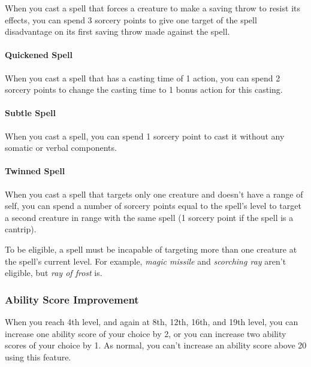 \documentclass[
]{article}
\begin{document}
When you cast a spell that forces a creature to make a saving throw to
resist its effects, you can spend 3 sorcery points to give one target of
the spell disadvantage on its first saving throw made against the spell.

\hypertarget{quickened-spell}{%
\paragraph{Quickened Spell}\label{quickened-spell}}

When you cast a spell that has a casting time of 1 action, you can spend
2 sorcery points to change the casting time to 1 bonus action for this
casting.

\hypertarget{subtle-spell}{%
\paragraph{Subtle Spell}\label{subtle-spell}}

When you cast a spell, you can spend 1 sorcery point to cast it without
any somatic or verbal components.

\hypertarget{twinned-spell}{%
\paragraph{Twinned Spell}\label{twinned-spell}}

When you cast a spell that targets only one creature and doesn't have a
range of self, you can spend a number of sorcery points equal to the
spell's level to target a second creature in range with the same spell
(1 sorcery point if the spell is a cantrip).

To be eligible, a spell must be incapable of targeting more than one
creature at the spell's current level. For example, \emph{magic missile}
and \emph{scorching ray} aren't eligible, but \emph{ray of frost} is.

\hypertarget{ability-score-improvement}{%
\subsubsection{Ability Score
Improvement}\label{ability-score-improvement}}

When you reach 4th level, and again at 8th, 12th, 16th, and 19th level,
you can increase one ability score of your choice by 2, or you can
increase two ability scores of your choice by 1. As normal, you can't
increase an ability score above 20 using this feature.
\end{document}
